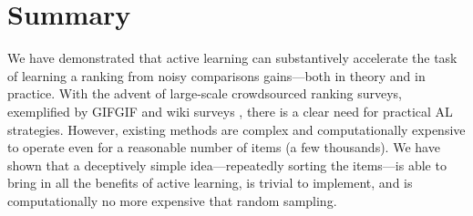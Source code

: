 \section{Summary}  %
\label{rs:sec:summary}

We have demonstrated that active learning can substantively accelerate the task of learning a ranking from noisy comparisons gains---both in theory and in practice.
With the advent of large-scale crowdsourced ranking surveys, exemplified by GIFGIF and wiki surveys \citep{salganik2015wiki}, there is a clear need for practical AL strategies.
However, existing methods are complex and computationally expensive to operate even for a reasonable number of items (a few thousands).
We have shown that a deceptively simple idea---repeatedly sorting the items---is able to bring in all the benefits of active learning, is trivial to implement, and is computationally no more expensive that random sampling.
